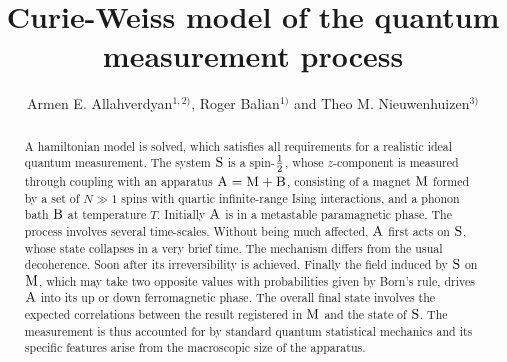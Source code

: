 
\draft
\title{Curie-Weiss model of the quantum measurement process} 
\author{Armen E. Allahverdyan$^{1,2)}$, Roger Balian$^{1)}$ 
and Theo M. Nieuwenhuizen$^{3)}$}

\address{$^{1)}$ SPhT, CEA Saclay, 91191 Gif-sur-Yvette cedex, France
\\ $^{2)}$Yerevan Physics Institute,
Alikhanian Brothers St. 2, Yerevan 375036, Armenia\\
$^{3)}$ Institute for Theoretical Physics, %
Valckenierstraat 65, 1018 XE Amsterdam, The Netherlands} 

\maketitle

\begin{abstract}
A hamiltonian model is solved, which satisfies all  requirements
for a realistic ideal quantum measurement. The system ${\rm S}$ is a spin-$\frac{1}{2}$,
whose $z$-component is measured through coupling with an apparatus 
${\rm A}={\rm M}+{\rm B}$, consisting of a magnet ${\rm M}$ formed by a set of
$N\gg 1$ spins with quartic infinite-range
Ising interactions,  and a phonon bath ${\rm B}$ at temperature $T$.
Initially ${\rm A}$ is in a metastable paramagnetic phase.
The process involves several time-scales.
Without being much affected, ${\rm A}$ first acts on ${\rm S}$, whose state
collapses in a very brief time. The mechanism differs from the usual 
decoherence. Soon after its irreversibility is achieved. Finally
the field induced by ${\rm S}$ on ${\rm M}$,
which may take two opposite values with probabilities given by Born's rule, 
drives ${\rm A}$ into its up or down ferromagnetic phase.
The overall final state involves the expected correlations between the
result registered in ${\rm M}$ and the state of ${\rm S}$.
The measurement 
is thus accounted for by standard quantum statistical 
mechanics and its specific features arise from the macroscopic size
of the apparatus.

\end{abstract}


